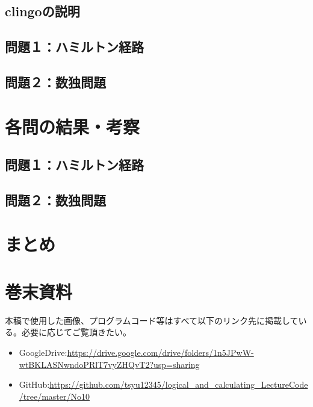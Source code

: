 \documentclass[dvipdfmx]{jsarticle}
\begin{document}
\subsection{clingoの説明}
\subsection{問題１：ハミルトン経路}
\subsection{問題２：数独問題}

\section{各問の結果・考察}
\subsection{問題１：ハミルトン経路}
\subsection{問題２：数独問題}

\section{まとめ}
\section{巻末資料}
本稿で使用した画像、プログラムコード等はすべて以下のリンク先に掲載している。必要に応じてご覧頂きたい。
\begin{itemize}
  \item GoogleDrive:\url{https://drive.google.com/drive/folders/1n5JPwW-wtBKLASNwndoPRlT7vyZHQvT2?usp=sharing}
  \item GitHub:\url{https://github.com/tsyu12345/logical_and_calculating_LectureCode/tree/master/No10}
\end{itemize}
\end{document}
